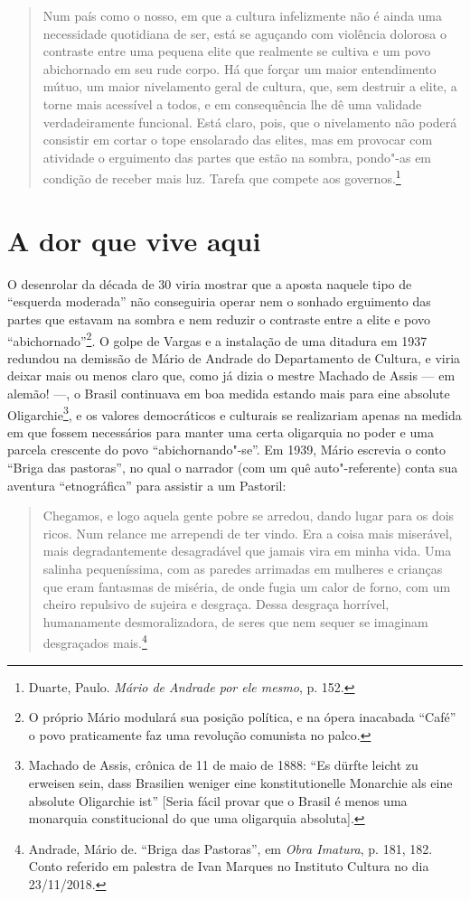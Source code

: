 \begin{quote}
Num país como o nosso, em que a cultura infelizmente não é ainda uma
necessidade quotidiana de ser, está se aguçando com violência dolorosa o
contraste entre uma pequena elite que realmente se cultiva e um povo
abichornado em seu rude corpo. Há que forçar um maior entendimento
mútuo, um maior nivelamento geral de cultura, que, sem destruir a elite,
a torne mais acessível a todos, e em consequência lhe dê uma validade
verdadeiramente funcional. Está claro, pois, que o nivelamento não
poderá consistir em cortar o tope ensolarado das elites, mas em provocar
com atividade o erguimento das partes que estão na sombra, pondo"-as em
condição de receber mais luz. Tarefa que compete aos governos.\footnote{Duarte,
  Paulo. \emph{Mário de Andrade por ele mesmo}, p. 152.}
\end{quote}

\section*{A dor que vive aqui}

O desenrolar da década de 30 viria mostrar que a aposta naquele tipo de
``esquerda moderada'' não conseguiria operar nem o sonhado erguimento
das partes que estavam na sombra e nem reduzir o contraste entre a elite
e povo ``abichornado''\footnote{O próprio Mário modulará sua posição
  política, e na ópera inacabada ``Café'' o povo praticamente faz uma
  revolução comunista no palco.}. O golpe de Vargas e a instalação de
uma ditadura em 1937 redundou na demissão de Mário de Andrade do
Departamento de Cultura, e viria deixar mais ou menos claro que, como já
dizia o mestre Machado de Assis --- em alemão! ---, o Brasil continuava em
boa medida estando mais para eine absolute Oligarchie\footnote{Machado
  de Assis, crônica de 11 de maio de 1888: ``Es dürfte leicht zu
  erweisen sein, dass Brasilien weniger eine konstitutionelle Monarchie
  als eine absolute Oligarchie ist'' {[}Seria fácil provar que o Brasil
  é menos uma monarquia constitucional do que uma oligarquia
  absoluta{]}.}, e os valores democráticos e culturais se realizariam
apenas na medida em que fossem necessários para manter uma certa
oligarquia no poder e uma parcela crescente do povo ``abichornando"-se''.
Em 1939, Mário escrevia o conto ``Briga das pastoras'', no qual o
narrador (com um quê auto"-referente) conta sua aventura ``etnográfica''
para assistir a um Pastoril:

\begin{quote}
Chegamos, e logo aquela gente pobre se arredou, dando lugar para os dois
ricos. Num relance me arrependi de ter vindo. Era a coisa mais
miserável, mais degradantemente desagradável que jamais vira em minha
vida. Uma salinha pequeníssima, com as paredes arrimadas em mulheres e
crianças que eram fantasmas de miséria, de onde fugia um calor de forno,
com um cheiro repulsivo de sujeira e desgraça. Dessa desgraça horrível,
humanamente desmoralizadora, de seres que nem sequer se imaginam
desgraçados mais.\footnote{Andrade, Mário de. ``Briga das Pastoras'', em
  \emph{Obra Imatura}, p. 181, 182. Conto referido em palestra de Ivan
  Marques no Instituto  Cultura no dia 23/11/2018.}
\end{quote}

